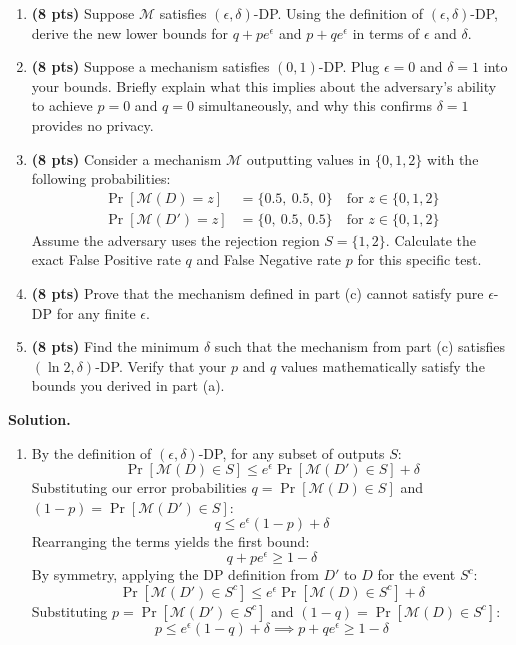 \documentclass[12pt]{article}
\begin{document}
\begin{enumerate}
\begin{enumerate}
    \item[(a)] \textbf{(8 pts)} Suppose $\mathcal{M}$ satisfies $(\epsilon, \delta)$-DP. 
    Using the definition of $(\epsilon,\delta)$-DP, derive the new lower bounds for $q + p e^\epsilon$ and $p + q e^\epsilon$ in terms of $\epsilon$ and $\delta$.
    
    \item[(b)] \textbf{(8 pts)} Suppose a mechanism satisfies $(0, 1)$-DP. Plug $\epsilon=0$ and $\delta=1$ into your bounds. Briefly explain what this implies about the adversary's ability to achieve $p=0$ and $q=0$ simultaneously, and why this confirms $\delta=1$ provides no privacy.
    
    \item[(c)] \textbf{(8 pts)} Consider a mechanism $\mathcal{M}$ outputting values in $\{0, 1, 2\}$ with the following probabilities:
    \begin{align*}
        \Pr[\mathcal{M}(D) = z] &= \{0.5,\ 0.5,\ 0\} \quad \text{for } z \in \{0, 1, 2\} \\
        \Pr[\mathcal{M}(D') = z] &= \{0,\ 0.5,\ 0.5\} \quad \text{for } z \in \{0, 1, 2\}
    \end{align*}
    Assume the adversary uses the rejection region $S = \{1, 2\}$. Calculate the exact False Positive rate $q$ and False Negative rate $p$ for this specific test.
    
    \item[(d)] \textbf{(8 pts)} Prove that the mechanism defined in part (c) cannot satisfy pure $\epsilon$-DP for any finite $\epsilon$.
    
    \item[(e)] \textbf{(8 pts)} Find the minimum $\delta$ such that the mechanism from part (c) satisfies $(\ln 2, \delta)$-DP. Verify that your $p$ and $q$ values mathematically satisfy the bounds you derived in part (a).
\end{enumerate}

\begin{solution}
\textbf{Solution.}\\
\begin{enumerate}
    \item[(a)] 
    By the definition of $(\epsilon, \delta)$-DP, for any subset of outputs $S$:
    \[ \Pr[\mathcal{M}(D) \in S] \le e^\epsilon \Pr[\mathcal{M}(D') \in S] + \delta \]
    Substituting our error probabilities $q = \Pr[\mathcal{M}(D) \in S]$ and $(1-p) = \Pr[\mathcal{M}(D') \in S]$:
    \[ q \le e^\epsilon (1-p) + \delta \]
    Rearranging the terms yields the first bound:
    \[ q + p e^\epsilon \ge 1 - \delta \]
    By symmetry, applying the DP definition from $D'$ to $D$ for the event $S^c$:
    \[ \Pr[\mathcal{M}(D') \in S^c] \le e^\epsilon \Pr[\mathcal{M}(D) \in S^c] + \delta \]
    Substituting $p = \Pr[\mathcal{M}(D') \in S^c]$ and $(1-q) = \Pr[\mathcal{M}(D) \in S^c]$:
    \[ p \le e^\epsilon (1-q) + \delta \implies p + q e^\epsilon \ge 1 - \delta \]


\end{enumerate}
\end{solution}
\end{enumerate}
\end{document}
